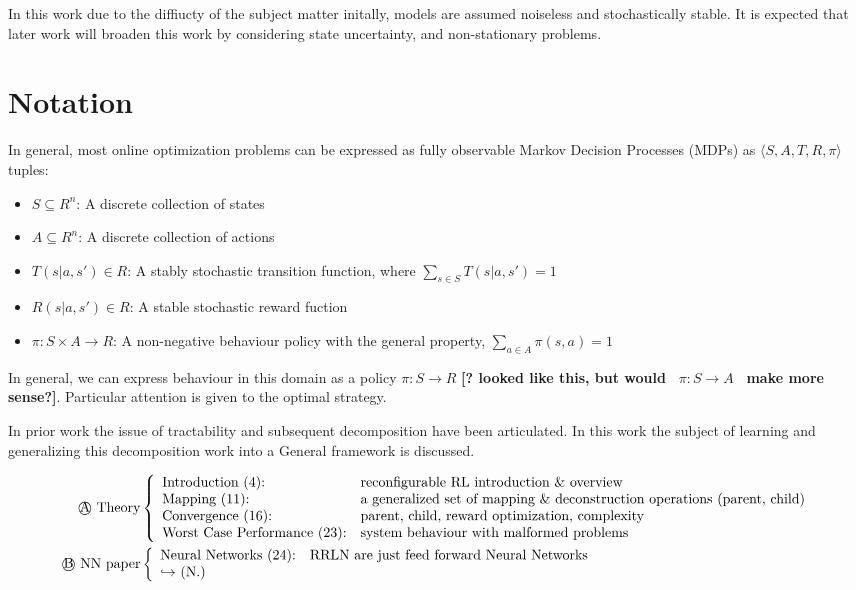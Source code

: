 In this work due to the diffiucty of the subject matter initally, models are assumed noiseless and stochastically stable. It is expected that later work will broaden this work by considering state uncertainty, and non-stationary problems.

\section*{Notation}

In general, most online optimization problems can be expressed as fully observable Markov Decision Processes (MDPs)
as \( \langle S, A, T, R,\pi \rangle \) tuples: 

\begin{itemize}  
\item $S \subseteq R^{n}$:  A discrete collection of states
\item $A \subseteq R^{n}$:  A discrete collection of actions
\item $T(s|a,s') \in R $:  A stably stochastic transition function, where $\sum_{s \in S} T(s|a,s') = 1 $
\item $R(s|a,s') \in R $:  A stable stochastic reward fuction
\item $\pi: S\times A \rightarrow R $:  A non-negative behaviour policy with the general property, $\sum_{a \in A} \pi(s,a) = 1$

\end{itemize}


In general, we can express behaviour in this domain as a policy \( \pi: S\rightarrow R\) {\textbf{[? looked like this, but would\ }}  \(\pi:S\rightarrow A \) 
{\textbf{\ make more sense?]}}. Particular attention is given to the optimal strategy.

In prior work the issue of tractability and subsequent decomposition have been articulated.  In this work the subject of learning
and generalizing this decomposition work into a General framework is discussed.

\begin{align*}
\text{\textcircled{A} Theory} & \left\{ 
\begin{array}{ll}
\text{Introduction (4):} & \text{reconfigurable RL introduction \& overview} \\
\text{Mapping (11):} & \text{a generalized set of mapping \& deconstruction operations (parent, child)} \\
\text{Convergence (16):} & \text{parent, child, reward optimization, complexity} \\
\text{Worst Case Performance (23):} & \text{system behaviour with malformed problems}
\end{array}
\right. \\
\text{\textcircled{B} NN paper} & \left\{ 
\begin{array}{ll}
\text{Neural Networks (24):} & \text{RRLN are just feed forward Neural Networks} \\
\text{\(\hookrightarrow\) (N.)} &  \text{\ }
\end{array}
\right.
\end{align*}

